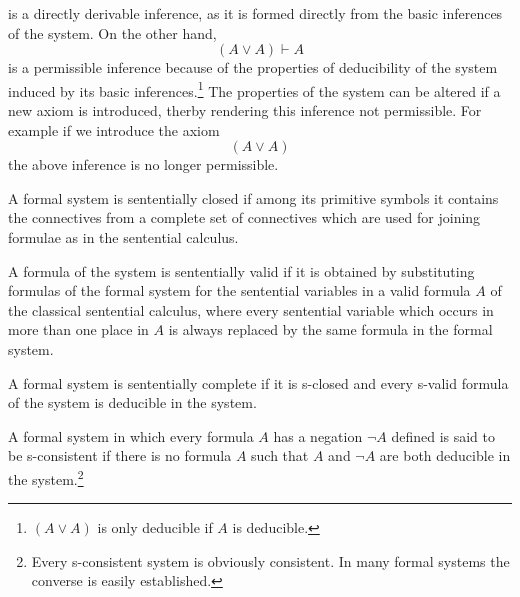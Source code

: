 \documentclass[nobib,notoc]{tufte-handout}
\begin{document}
is a directly derivable inference, as it is formed directly from the basic inferences of the system. On the other hand,
\begin{equation*}
	(A\vee A)\vdash A
\end{equation*}
is a permissible inference because of the properties of deducibility of the system induced by its basic inferences.\footnote{\((A\vee A)\) is only deducible if \(A\) is deducible.} The properties of the system can be altered if a new axiom is introduced, therby rendering this inference not permissible. For example if we introduce the axiom
\begin{equation*}
	(A\vee A)
\end{equation*}
the above inference is no longer permissible.
\begin{defi}
	A formal system is sententially closed if among its primitive symbols it contains the connectives from a complete set of connectives which are used for joining formulae as in the sentential calculus.
\end{defi}
\begin{defi}
	A formula of the system is sententially valid if it is obtained by substituting formulas of the formal system for the sentential variables in a valid formula \(A\) of the classical sentential calculus, where every sentential variable which occurs in more than one place in \(A\) is always replaced by the same formula in the formal system.
\end{defi}
\begin{defi}
	A formal system is sententially complete if it is s-closed and every s-valid formula of the system is deducible in the system.
\end{defi}
\begin{defi}
	A formal system in which every formula \(A\) has a negation \(\neg A\) defined is said to be s-consistent if there is no formula \(A\) such that \(A\) and \(\neg A\) are both deducible in the system.\footnote{Every s-consistent system is obviously consistent. In many formal systems the converse is easily established.}
\end{defi}
\end{document}
